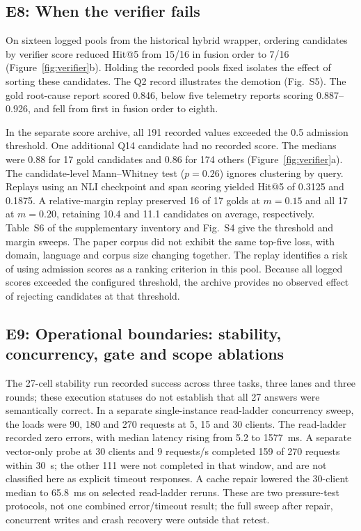 \subsection{E8: When the verifier fails}
\label{sec:e6}
\label{sec:inflation}\label{sec:eval-verify}
On sixteen logged pools from the historical hybrid wrapper, ordering
candidates by verifier score reduced Hit@5 from 15/16 in fusion order to
7/16 (Figure~\ref{fig:verifier}b). Holding the recorded pools fixed isolates
the effect of sorting these candidates. The Q2 record illustrates the
demotion (Fig.~S5). The gold root-cause report scored 0.846, below five
telemetry reports scoring 0.887--0.926, and fell from first in fusion order
to eighth.

In the separate score archive, all 191 recorded values exceeded the
0.5 admission threshold. One additional Q14 candidate had no recorded
score. The medians were 0.88 for 17 gold candidates and 0.86 for 174
others (Figure~\ref{fig:verifier}a). The candidate-level Mann--Whitney
test ($p=0.26$) ignores clustering by query. Replays using an NLI
checkpoint and span scoring yielded Hit@5 of 0.3125 and 0.1875. A
relative-margin replay preserved 16 of 17 golds at $m=0.15$ and all 17
at $m=0.20$, retaining 10.4 and 11.1 candidates on average, respectively.
Table~S6 of the supplementary inventory and Fig.~S4 give the threshold
and margin sweeps. The paper corpus did not exhibit the same top-five
loss, with domain, language and corpus size changing together. The
replay identifies a risk of using admission scores as a ranking
criterion in this pool. Because all logged scores exceeded the configured
threshold, the archive provides no observed effect of rejecting
candidates at that threshold.

\subsection{E9: Operational boundaries: stability, concurrency, gate and
scope ablations}
\label{sec:e7}
The 27-cell stability run recorded success across three tasks, three lanes
and three rounds; these execution statuses do not establish that all 27
answers were semantically correct. In a separate
single-instance read-ladder concurrency sweep, the loads were 90, 180 and
270 requests at 5, 15 and 30 clients. The read-ladder recorded zero errors,
with median latency rising from 5.2 to 1577~ms. A separate vector-only
probe at 30 clients and 9 requests/s completed 159 of 270 requests within
30~s; the other 111 were not completed in that window, and are not
classified here as explicit timeout responses. A cache repair lowered the
30-client median to 65.8~ms on selected read-ladder reruns. These are two
pressure-test protocols, not one combined error/timeout result; the full
sweep after repair, concurrent writes and crash recovery were outside that
retest.

